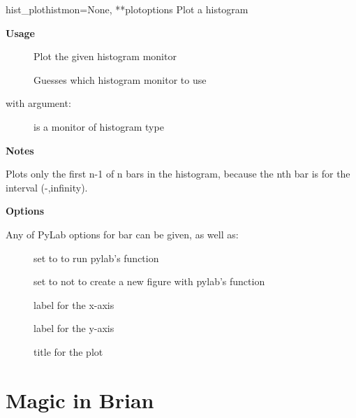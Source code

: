 \documentclass[letterpaper,10pt]{manual}
\begin{document}
\hypertarget{brian.hist_plot}{}\begin{funcdesc}{hist\_plot}{histmon=None, **plotoptions}
Plot a histogram

\textbf{Usage}
\begin{description}
\item[]
Plot the given histogram monitor

\item[]
Guesses which histogram monitor to use

\end{description}

with argument:
\begin{description}
\item[]
is a monitor of histogram type

\end{description}

\textbf{Notes}

Plots only the first n-1 of n bars in the histogram, because
the nth bar is for the interval (-,infinity).

\textbf{Options}

Any of PyLab options for bar can be given, as well as:
\begin{description}
\item[]
set to  to run pylab's  function

\item[]
set to  not to create a new figure with pylab's  function

\item[]
label for the x-axis

\item[]
label for the y-axis

\item[]
title for the plot

\end{description}
\end{funcdesc}

\resetcurrentobjects
{}

\hypertarget{index-72}{}\section{Magic in Brian}
\end{document}
